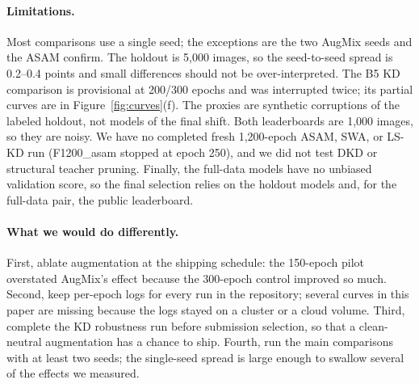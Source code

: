 \paragraph{Limitations.}
Most comparisons use a single seed; the exceptions are the two AugMix seeds and
the ASAM confirm. The holdout is 5,000 images, so the seed-to-seed spread is
0.2--0.4 points and small differences should not be over-interpreted. The B5 KD
comparison is provisional at 200/300 epochs and was interrupted twice; its
partial curves are in Figure~\ref{fig:curves}(f). The proxies are synthetic corruptions of the labeled holdout, not models of the final
shift. Both leaderboards are 1,000 images, so they are noisy. We have no completed fresh 1,200-epoch ASAM,
SWA, or LS-KD run (F1200\_asam stopped at epoch 250), and we did not test DKD or
structural teacher pruning. Finally, the full-data models have no unbiased
validation score, so the final selection relies on the holdout models and, for
the full-data pair, the public leaderboard.

\paragraph{What we would do differently.}
First, ablate augmentation at the shipping schedule: the 150-epoch pilot
overstated AugMix's effect because the 300-epoch control improved so much. Second, keep per-epoch logs for every run in the repository; several
curves in this paper are missing because the logs stayed on a cluster or a cloud
volume. Third, complete the KD robustness run before submission selection, so
that a clean-neutral augmentation has a chance to ship. Fourth, run the main
comparisons with at least two seeds; the single-seed spread is large enough to
swallow several of the effects we measured.
